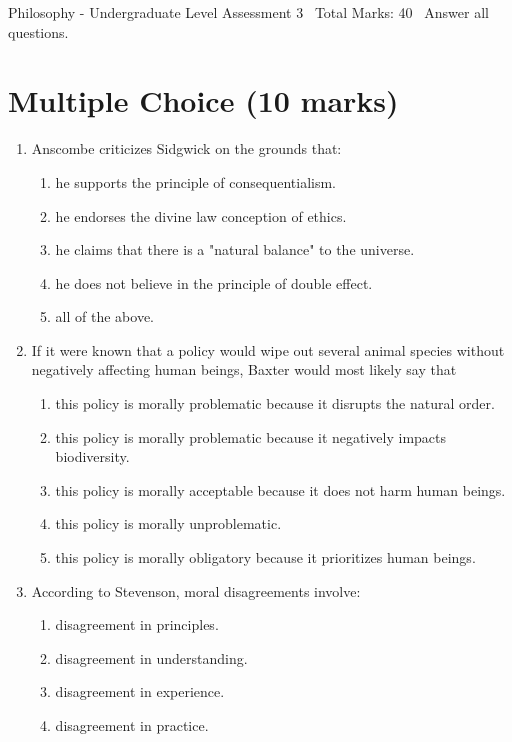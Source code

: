 \documentclass[12pt]{article}
\begin{document}
\begin{center}
Philosophy - Undergraduate Level Assessment 3 \
Total Marks: 40 \
Answer all questions.
\end{center}

\section*{Multiple Choice (10 marks)}
\begin{enumerate}[label=\arabic*.]
\item Anscombe criticizes Sidgwick on the grounds that:
\begin{enumerate}[label=(\alph*)]
    \item he supports the principle of consequentialism.
    \item he endorses the divine law conception of ethics.
    \item he claims that there is a "natural balance" to the universe.
    \item he does not believe in the principle of double effect.
    \item all of the above.
\end{enumerate}
\item If it were known that a policy would wipe out several animal species without negatively
affecting human beings, Baxter would most likely say that
\begin{enumerate}[label=(\alph*)]
    \item this policy is morally problematic because it disrupts the natural order.
    \item this policy is morally problematic because it negatively impacts biodiversity.
    \item this policy is morally acceptable because it does not harm human beings.
    \item this policy is morally unproblematic.
    \item this policy is morally obligatory because it prioritizes human beings.
\end{enumerate}
\item According to Stevenson, moral disagreements involve:
\begin{enumerate}[label=(\alph*)]
    \item disagreement in principles.
    \item disagreement in understanding.
    \item disagreement in experience.
    \item disagreement in practice.

\end{enumerate}
\end{enumerate}
\end{document}
